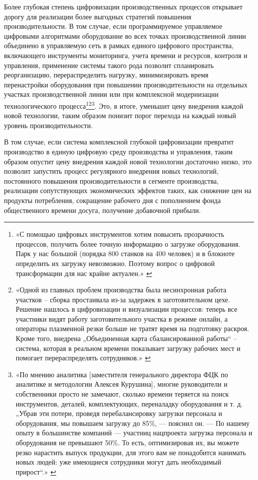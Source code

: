 \documentclass{article}
\begin{document}
Более глубокая степень цифровизации производственных процессов открывает дорогу для реализации более выгодных стратегий повышения производительности. В том случае, если программируемое управляемое цифровыми алгоритмами оборудование во всех точках производственной линии объединено в управляемую сеть в рамках единого цифрового пространства, включающего инструменты мониторинга, учета времени и ресурсов, контроля и управления, применение системы такого рода позволит спланировать реорганизацию, перераспределить нагрузку, минимизировать время перенастройки оборудования при повышении производительности на отдельных участках производственной линии или при комплексной модернизации технологического процесса\footnote{«С помощью цифровых инструментов хотим повысить прозрачность процессов, получить более точную информацию о загрузке оборудования. Парк у нас большой (порядка 800 станков на 400 человек) и в блокноте определить их загрузку невозможно. Поэтому вопрос о цифровой трансформации для нас крайне актуален.» \cite{minecoLabourProductivityCoverage2024}}\footnote{«Одной из главных проблем производства была несинхронная работа участков – сборка простаивала из-за задержек в заготовительном цехе. Решение нашлось в цифровизации и визуализации процессов: теперь все участники видят работу заготовительного участка в режиме онлайн, а операторы плазменной резки больше не тратят время на подготовку раскроя. Кроме того, внедрена „Объединенная карта сбалансированной работы“ – система, которая в реальном времени показывает загрузку рабочих мест и помогает перераспределять сотрудников.» \cite{minecoIntexVolumeExpansion2025}}\footnote{«По мнению аналитика [заместителя генерального директора ФЦК по аналитике и методологии Алексея Курушина], многие руководители и собственники просто не замечают, сколько времени теряется на поиск инструментов, деталей, комплектующих, переналадку оборудования и т. д. „Убрав эти потери, проведя перебалансировку загрузки персонала и оборудования, мы повышаем загрузку до 85\%, — пояснил он. — По нашему опыту в большинстве компаний — участниц нацпроекта загрузка персонала и оборудования не превышают 50\%. То есть, оптимизировав их, вы можете резко нарастить выпуск продукции, для этого вам не понадобится нанимать новых людей: уже имеющиеся сотрудники могут дать необходимый прирост“.» \cite{vedomostiRussianIndustryEfficiency2024}}. Это, в итоге, уменьшит цену внедрения каждой новой технологии, таким образом понизит порог перехода на каждый новый уровень производительности.

В том случае, если система комплексной глубокой цифровизации превратит производство в единую цифровую среду производства и управления, таким образом опустит цену внедрения каждой новой технологии достаточно низко, это позволит запустить процесс регулярного внедрения новых технологий, постоянного повышения производительности в сегменте производства, реализации сопутствующих экономических эффектов таких, как снижение цен на продукты потребления, сокращение рабочего дня с пополнением фонда общественного времени досуга, получение добавочной прибыли.
\end{document}
